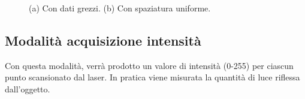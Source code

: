 \begin{figure}[H]
	\centering
	\hspace{1em}
	\caption{(a) Con dati grezzi. (b) Con spaziatura uniforme.}\label{fig:active_area}
\end{figure}

\subsection{Modalità acquisizione intensità}
Con questa modalità, verrà prodotto un valore di intensità (0-255) per ciascun punto scansionato dal laser. In pratica viene misurata la quantità di luce riflessa dall'oggetto.


